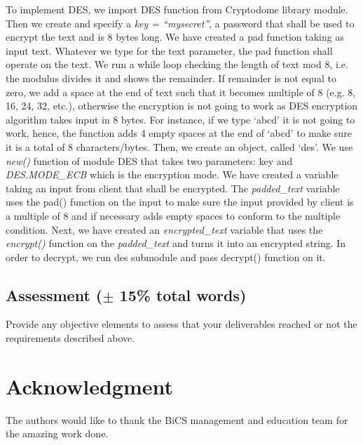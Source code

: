 To implement DES, we import DES function from Cryptodome library module. Then we create and specify a \textit{key = “mysecret”}, a password that shall be used to encrypt the text and is 8 bytes long. We have created a pad function taking as input text. Whatever we type for the text parameter, the pad function shall operate on the text. We run a while loop checking the length of text mod 8, i.e. the modulus divides it and shows the remainder. If remainder is not equal to zero, we add a space at the end of text such that it becomes multiple of 8 (e.g. 8, 16, 24, 32, etc.), otherwise the encryption is not going to work as DES encryption algorithm takes input in 8 bytes. For instance, if we type ‘abcd’ it is not going to work, hence, the function adds 4 empty spaces at the end of ‘abcd’ to make sure it is a total of 8 characters/bytes. Then, we create an object, called ‘des’. We use \textit{new()} function of module DES that takes two parameters: key and \textit{DES.MODE_ECB} which is the encryption mode. We have created a variable taking an input from client that shall be encrypted. The \textit{padded_text} variable uses the pad() function on the input to make sure the input provided by client is a multiple of 8 and if necessary adds empty spaces to conform to the multiple condition. Next, we have created an \textit{encrypted_text} variable that uses the \textit{encrypt()} function on the \textit{padded_text} and turns it into an encrypted string. In order to decrypt, we run des submodule and pass decrypt() function on it. 



\subsection{Assessment ($\pm$ 15\% total words)}
Provide any objective elements to assess that your deliverables reached or not the requirements described above. 
\section*{Acknowledgment}
The authors would like to thank the BiCS management and education team for the amazing work done.